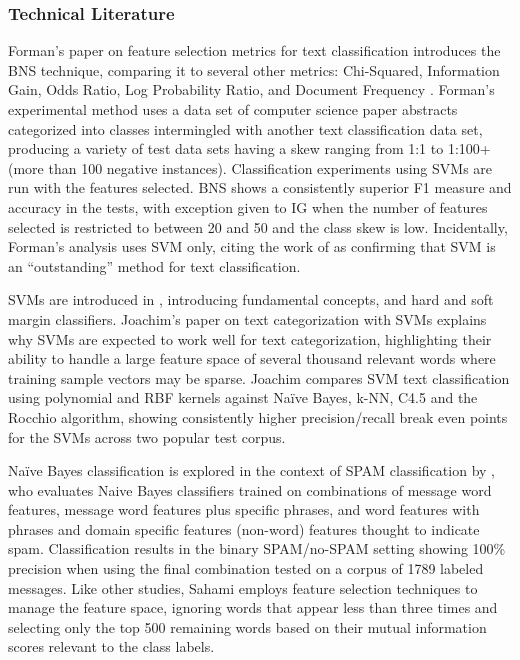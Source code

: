 \documentclass[twoside,11pt]{article}
\begin{document}
\subsubsection{Technical Literature}
Forman's paper on feature selection metrics for text classification introduces the BNS technique, comparing it to several other metrics:  Chi-Squared, Information Gain, Odds Ratio,  Log Probability Ratio, and Document Frequency \citep{Forman}. Forman's experimental method uses a data set of computer science paper abstracts categorized into classes intermingled with another text classification data set, producing a variety of test data sets having a skew ranging from 1:1 to 1:100+ (more than 100 negative instances). Classification experiments using SVMs are run with the features selected. BNS shows a consistently superior F1 measure and accuracy in the tests, with exception given to IG when the number of features selected is restricted to between 20 and 50 and the class skew is low. Incidentally, Forman's analysis uses SVM only, citing the work of \citet{Joachims} as confirming that SVM is an ``outstanding'' method for text classification.
\par SVMs are introduced in \citep{Vapnik}, introducing fundamental concepts, and hard and soft margin classifiers. Joachim's paper on text categorization with SVMs \citep{Joachims} explains why SVMs are expected to work well for text categorization, highlighting their ability to handle a large feature space of several thousand relevant words where training sample vectors may be sparse. Joachim compares SVM text classification using polynomial and RBF kernels against Na\"ive Bayes, k-NN, C4.5 and the Rocchio algorithm, showing consistently higher precision/recall break even points for the SVMs across two popular test corpus.
\par Na\"ive Bayes classification is explored in the context of SPAM classification by \citet{Sahami}, who evaluates Naive Bayes classifiers trained on combinations of message word features, message word features plus specific phrases, and word features with phrases and domain specific features (non-word) features thought to indicate spam. Classification results in the binary SPAM/no-SPAM setting showing 100\% precision when using the final combination tested on a corpus of 1789 labeled messages. Like other studies, Sahami employs feature selection techniques to manage the feature space, ignoring words that appear less than three times and selecting only the top 500 remaining words based on their mutual information scores relevant to the class labels.
\end{document}
